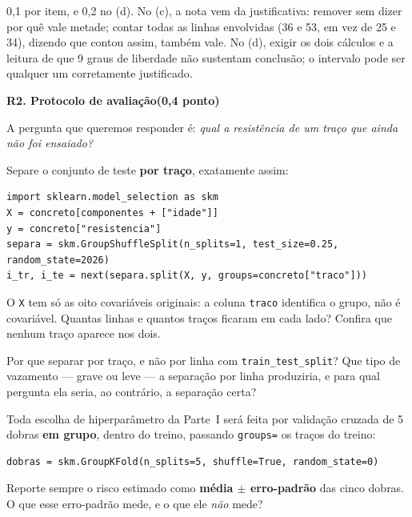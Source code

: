 \documentclass[11pt,a4paper]{article}
\newcommand{\tarefa}[3]{%
  \bigskip\par\noindent
  {\large\bfseries\color{azulufrj}#1. #2}\hfill{\bfseries(#3)}\par
  \nopagebreak\vspace{0.3em}}
\newcommand{\cod}[1]{\texttt{#1}}
\begin{document}
\begin{criterio}
0,1 por item, e 0,2 no (d). No (c), a nota vem da justificativa: remover sem dizer
por quê vale metade; contar todas as linhas envolvidas (36 e 53, em vez de 25 e 34),
dizendo que contou assim, também vale. No (d), exigir os dois cálculos e a leitura de que 9 graus de
liberdade não sustentam conclusão; o intervalo pode ser qualquer um corretamente
justificado.
\end{criterio}

\tarefa{R2}{Protocolo de avaliação}{0,4 ponto}
A pergunta que queremos responder é: \emph{qual a
resistência de um traço que ainda não foi ensaiado?}

\begin{itens}
  \item Separe o conjunto de teste \textbf{por traço}, exatamente assim:
\begin{lstlisting}
import sklearn.model_selection as skm
X = concreto[componentes + ["idade"]]
y = concreto["resistencia"]
separa = skm.GroupShuffleSplit(n_splits=1, test_size=0.25, random_state=2026)
i_tr, i_te = next(separa.split(X, y, groups=concreto["traco"]))
\end{lstlisting}
        O \cod{X} tem só as oito covariáveis originais: a coluna \cod{traco} identifica
        o grupo, não é covariável. Quantas linhas e quantos traços ficaram em cada lado?
        Confira que nenhum traço aparece nos dois.
  \item Por que separar por traço, e não por linha com \cod{train\_test\_split}? Que
        tipo de vazamento --- grave ou leve --- a separação por linha produziria,
        e para qual pergunta ela seria, ao contrário, a separação certa?
  \item Toda escolha de hiperparâmetro da Parte~I será feita por validação cruzada
        de 5 dobras \textbf{em grupo}, dentro do treino, passando \cod{groups=} os
        traços do treino:
\begin{lstlisting}
dobras = skm.GroupKFold(n_splits=5, shuffle=True, random_state=0)
\end{lstlisting}
        Reporte sempre o risco estimado como
        \textbf{média $\pm$ erro-padrão} das cinco dobras. O que esse erro-padrão
        mede, e o que ele \emph{não} mede?
\end{itens}
\end{document}
